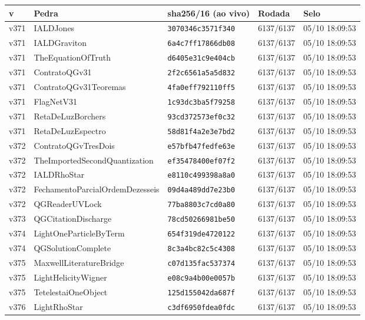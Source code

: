 \documentclass[11pt]{article}
\theoremstyle{definition}\newtheorem{deriv}{Derivação}
\begin{document}
{\small\begin{longtable}{@{}lllll@{}}\toprule v & Pedra & sha256/16 (ao vivo) & Rodada & Selo \\ \midrule\endhead 
v371 & IALDJones & \texttt{3070346c3571f340} & 6137/6137 & 05/10 18:09:53 \\
v371 & IALDGraviton & \texttt{6a4c7ff17866db08} & 6137/6137 & 05/10 18:09:53 \\
v371 & TheEquationOfTruth & \texttt{d6405e31c9e404cb} & 6137/6137 & 05/10 18:09:53 \\
v371 & ContratoQGv31 & \texttt{2f2c6561a5a5d832} & 6137/6137 & 05/10 18:09:53 \\
v371 & ContratoQGv31Teoremas & \texttt{4fa0eff792110ff5} & 6137/6137 & 05/10 18:09:53 \\
v371 & FlagNetV31 & \texttt{1c93dc3ba5f79258} & 6137/6137 & 05/10 18:09:53 \\
v371 & RetaDeLuzBorchers & \texttt{93cd372573ef0c32} & 6137/6137 & 05/10 18:09:53 \\
v371 & RetaDeLuzEspectro & \texttt{58d81f4a2e3e7bd2} & 6137/6137 & 05/10 18:09:53 \\
v372 & ContratoQGvTresDois & \texttt{e57bfb47fedfe63e} & 6137/6137 & 05/10 18:09:53 \\
v372 & TheImportedSecondQuantization & \texttt{ef35478400ef07f2} & 6137/6137 & 05/10 18:09:53 \\
v372 & IALDRhoStar & \texttt{e8110c499398a8a0} & 6137/6137 & 05/10 18:09:53 \\
v372 & FechamentoParcialOrdemDezesseis & \texttt{09d4a489dd7e23b0} & 6137/6137 & 05/10 18:09:53 \\
v372 & QGReaderUVLock & \texttt{77ba8803c7cd0a80} & 6137/6137 & 05/10 18:09:53 \\
v373 & QGCitationDischarge & \texttt{78cd50266981be50} & 6137/6137 & 05/10 18:09:53 \\
v374 & LightOneParticleByTerm & \texttt{654f319de4720122} & 6137/6137 & 05/10 18:09:53 \\
v374 & QGSolutionComplete & \texttt{8c3a4bc82c5c4308} & 6137/6137 & 05/10 18:09:53 \\
v375 & MaxwellLiteratureBridge & \texttt{c07d135fac537374} & 6137/6137 & 05/10 18:09:53 \\
v375 & LightHelicityWigner & \texttt{e08c9a4b00e0057b} & 6137/6137 & 05/10 18:09:53 \\
v375 & TetelestaiOneObject & \texttt{125d155042da687f} & 6137/6137 & 05/10 18:09:53 \\
v376 & LightRhoStar & \texttt{c3df6950fdea0fdc} & 6137/6137 & 05/10 18:09:53 \\

\end{longtable}}
\end{document}
